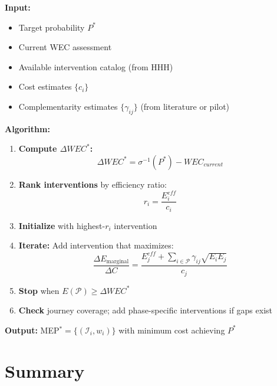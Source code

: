 \begin{tcolorbox}[colback=blue!5!white, colframe=blue!75!black,
    title=The MEP Design Algorithm]

\textbf{Input:}
\begin{itemize}[nosep]
\item Target probability $P^*$
\item Current WEC assessment
\item Available intervention catalog (from HHH)
\item Cost estimates $\{c_i\}$
\item Complementarity estimates $\{\gamma_{ij}\}$ (from literature or pilot)
\end{itemize}

\textbf{Algorithm:}
\begin{enumerate}
\item \textbf{Compute $\Delta WEC^*$:}
\begin{equation}
\Delta WEC^* = \sigma^{-1}(P^*) - WEC_{current}
\end{equation}

\item \textbf{Rank interventions} by efficiency ratio:
\begin{equation}
r_i = \frac{E_i^{eff}}{c_i}
\end{equation}

\item \textbf{Initialize} with highest-$r_i$ intervention

\item \textbf{Iterate:} Add intervention that maximizes:
\begin{equation}
\frac{\Delta E_{\text{marginal}}}{\Delta C} = \frac{E_j^{eff} + \sum_{i \in \mathcal{P}} \gamma_{ij}\sqrt{E_i E_j}}{c_j}
\end{equation}

\item \textbf{Stop} when $E(\mathcal{P}) \geq \Delta WEC^*$

\item \textbf{Check} journey coverage; add phase-specific interventions if gaps exist
\end{enumerate}

\textbf{Output:} MEP$^* = \{(\mathcal{I}_i, w_i)\}$ with minimum cost achieving $P^*$
\end{tcolorbox}


\section{Summary}
\label{sec:mep-summary}

